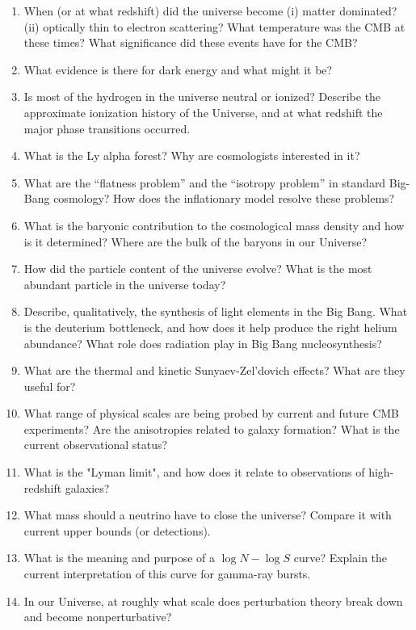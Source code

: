 \documentclass[11pt, oneside]{book}
\begin{document}
\begin{enumerate}[start=126, itemsep=0.4cm]
    \item When (or at what redshift) did the universe become (i) matter dominated? (ii) optically thin to electron scattering? What temperature was the CMB at these times? What significance did these events have for the CMB?
    \item What evidence is there for dark energy and what might it be?
    \item Is most of the hydrogen in the universe neutral or ionized? Describe the approximate ionization history of the Universe, and at what redshift the major phase transitions occurred.
    \item What is the Ly alpha forest? Why are cosmologists interested in it?
    \item What are the ``flatness problem'' and the ``isotropy problem'' in standard Big-Bang cosmology? How does the inflationary model resolve these problems?
    \item What is the baryonic contribution to the cosmological mass density and how is it determined? Where are the bulk of the baryons in our Universe?
    \item How did the particle content of the universe evolve? What is the most abundant particle in the universe today?
    \item Describe, qualitatively, the synthesis of light elements in the Big Bang. What is the deuterium bottleneck, and how does it help produce the right helium abundance? What role does radiation play in Big Bang nucleosynthesis?
    \item What are the thermal and kinetic Sunyaev-Zel'dovich effects? What are they useful for?
    \item What range of physical scales are being probed by current and future CMB experiments? Are the anisotropies related to galaxy formation? What is the current observational status?
    \item What is the "Lyman limit", and how does it relate to observations of high-redshift galaxies?
    \item What mass should a neutrino have to close the universe? Compare it with current upper bounds (or detections).
    \item What is the meaning and purpose of a $\log N - \log S$ curve? Explain the current interpretation of this curve for gamma-ray bursts.
    \item In our Universe, at roughly what scale does perturbation theory break down and become nonperturbative?
\end{enumerate}
\end{document}
